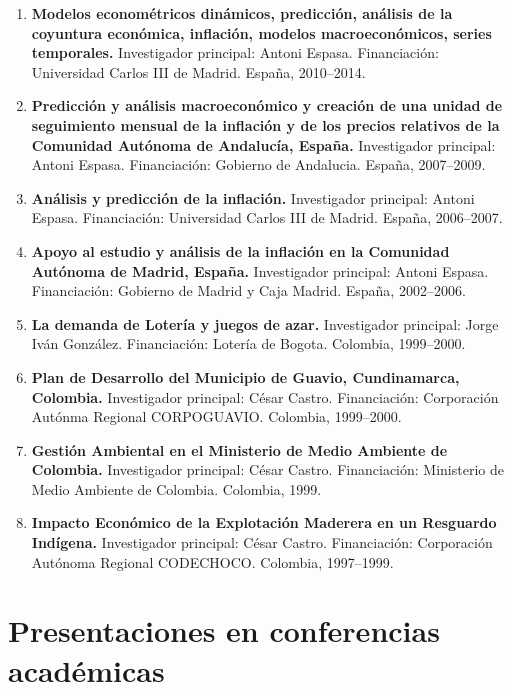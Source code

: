 \documentclass[11pt]{article}\usepackage[]{graphicx}\usepackage[]{color}
\begin{document}
\begin{enumerate}

\item \textbf{Modelos econométricos dinámicos, predicción, análisis de la
coyuntura económica, inflación, modelos macroeconómicos, series temporales.} Investigador principal: Antoni Espasa. Financiación: Universidad Carlos III de Madrid. España, 2010--2014.

\item \textbf{Predicción y análisis macroeconómico y creación de una unidad de seguimiento mensual de la inflación y de los precios relativos de la Comunidad Autónoma de Andalucía, España.} Investigador principal: Antoni Espasa. Financiación: Gobierno de Andalucia. España, 2007--2009.

\item \textbf{Análisis y predicción de la inflación.} Investigador principal: Antoni Espasa. Financiación: Universidad Carlos III de Madrid. España, 2006--2007.

\item \textbf{Apoyo al estudio y análisis de la inflación en la Comunidad 
Autónoma de Madrid, España.} Investigador principal: Antoni Espasa. Financiación: Gobierno de Madrid y Caja Madrid. España, 2002--2006.

\item \textbf{La demanda de Lotería y juegos de azar.} Investigador principal: Jorge Iván González. Financiación: Lotería de Bogota. Colombia, 1999--2000.

\item \textbf{Plan de Desarrollo del Municipio de Guavio, Cundinamarca, Colombia.} Investigador principal: César Castro. Financiación: Corporación Autónma Regional CORPOGUAVIO. Colombia, 1999--2000.

\item \textbf{Gestión Ambiental en el Ministerio de Medio Ambiente de Colombia.} Investigador principal: César Castro. Financiación: Ministerio de Medio Ambiente de Colombia. Colombia, 1999.

\item \textbf{Impacto Económico de la Explotación Maderera en un Resguardo Indígena.} Investigador principal: César Castro. Financiación: Corporación Autónoma Regional CODECHOCO. Colombia, 1997--1999.

\end{enumerate}

\section{Presentaciones en conferencias académicas} 
\end{document}
